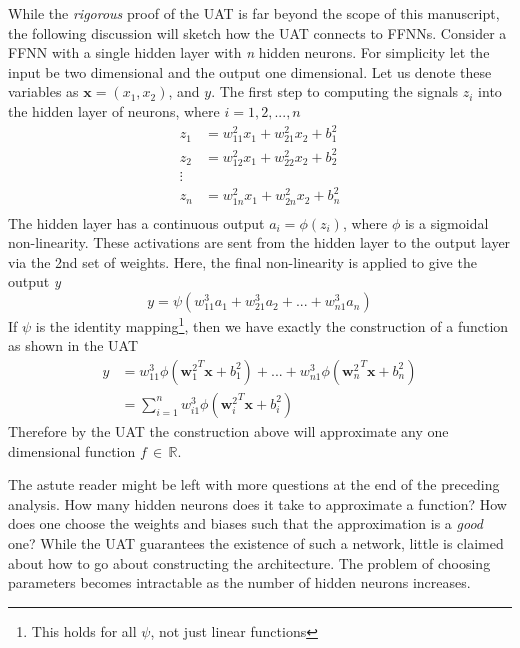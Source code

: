 While the \textit{rigorous} proof of the UAT is far beyond the scope of this manuscript, the following discussion will sketch how the UAT connects to FFNNs. Consider a FFNN with a single hidden layer with \textit{n} hidden neurons. For simplicity let the input be two dimensional and the output one dimensional. Let us denote these variables as $\textbf{x}=(x_1, x_2)$, and $y$. The first step to computing the signals $z_i$ into the hidden layer of neurons, where $i=1,2,...,n$
\begin{align*}
z_1 & = w^2_{11}x_1 + w^2_{21}x_2 + b^2_1 \\
z_2 & = w^2_{12}x_1 + w^2_{22}x_2 + b^2_2 \\
\vdots{}  \\
z_n & = w^2_{1n}x_1 + w^2_{2n}x_2 + b^2_n \\
\end{align*}
The hidden layer has a continuous output $a_i=\phi(z_i)$, where $\phi$ is a sigmoidal non-linearity. These activations are sent from the hidden layer to the output layer via the 2nd set of weights. Here, the final non-linearity is applied to give the output \textit{y}
\begin{equation*}
y = \psi\left(w^3_{11}a_1 + w^3_{21}a_2 + ... + w^3_{n1}a_n\right)
\end{equation*}
If $\psi$ is the identity mapping\footnote{This holds for all $\psi$, not just linear functions}, then we have exactly the construction of a function as shown in the UAT
\begin{align}
y & = w^3_{11}\phi({\textbf{w}^2_1}^T\textbf{x} + b^2_1) + ... + w^3_{n1}\phi({\textbf{w}^2_n}^T \textbf{x}+ b^2_n) \nonumber \\
& = \sum_{i=1}^{n} w^3_{i1}\phi({\textbf{w}^2_i}^T \textbf{x}+ b^2_i)
\end{align}
Therefore by the UAT the construction above will approximate any one dimensional function $f \, \in \, \mathbb{R}$.

The astute reader might be left with more questions at the end of the preceding analysis. How many hidden neurons does it take to approximate a function? How does one choose the weights and biases such that the approximation is a \textit{good} one? While the UAT guarantees the existence of such a network, little is claimed about how to go about constructing the architecture. The problem of choosing parameters becomes intractable as the number of hidden neurons increases. 


